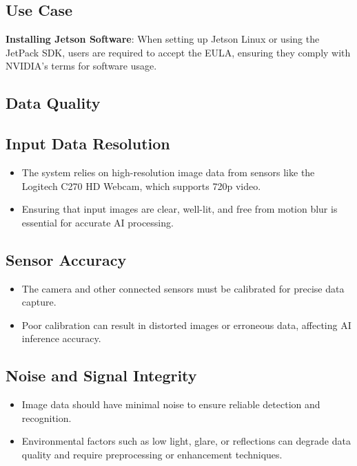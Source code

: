 \subsection*{Use Case}
\textbf{Installing Jetson Software}: When setting up Jetson Linux or using the JetPack SDK, users are required to accept the EULA, ensuring they comply with NVIDIA's terms for software usage. \cite{NJE:2025}


\subsection{Data Quality}

\subsection*{Input Data Resolution}
\begin{itemize}[leftmargin=1.5cm]
	\item The system relies on high-resolution image data from sensors like the Logitech C270 HD Webcam, which supports 720p video.
	\item Ensuring that input images are clear, well-lit, and free from motion blur is essential for accurate AI processing.
\end{itemize}

\subsection*{Sensor Accuracy}
\begin{itemize}[leftmargin=1.5cm]
	\item The camera and other connected sensors must be calibrated for precise data capture.
	\item Poor calibration can result in distorted images or erroneous data, affecting AI inference accuracy.
\end{itemize}

\subsection*{Noise and Signal Integrity}
\begin{itemize}[leftmargin=1.5cm]
	\item Image data should have minimal noise to ensure reliable detection and recognition.
	\item Environmental factors such as low light, glare, or reflections can degrade data quality and require preprocessing or enhancement techniques.
\end{itemize}

